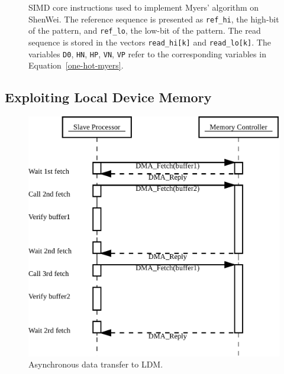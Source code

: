 \documentclass[conference]{IEEEtran}
\begin{document}
\begin{figure}[!htb]
	\caption{SIMD core instructions used to implement Myers' algorithm on ShenWei. The reference sequence is presented as \texttt{ref\_hi}, the high-bit of the pattern, and \texttt{ref\_lo}, the low-bit of the pattern. The read sequence is stored in the vectors \texttt{read\_hi[k]} and \texttt{read\_lo[k]}. The variables \texttt{D0}, \texttt{HN}, \texttt{HP}, \texttt{VN}, \texttt{VP} refer to the corresponding variables in Equation~\ref{one-hot-myers}.}
	\label{cores}
\end{figure}

\subsection{Exploiting Local Device Memory}

\begin{figure}[!htb]
	\includegraphics[width=1\linewidth]{figures/AsyncTrans}
	\caption{Asynchronous data transfer to LDM.}
	\label{AsyncTrans}
\end{figure}
\end{document}
